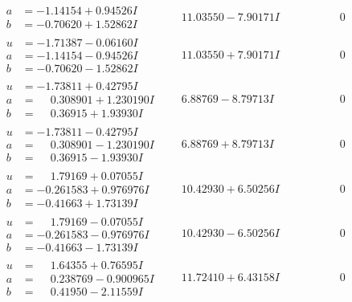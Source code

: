 \documentclass[1p]{elsarticle_modified}
\theoremstyle{definition}
\begin{document}
$$\begin{array}{c|c|c}
\begin{aligned}
a &= -1.14154 + 0.94526 I \\
b &= -0.70620 + 1.52862 I\end{aligned}
 & \phantom{-}11.03550 - 7.90171 I & \phantom{-0.000000 } 0 \\ \hline\begin{aligned}
u &= -1.71387 - 0.06160 I \\
a &= -1.14154 - 0.94526 I \\
b &= -0.70620 - 1.52862 I\end{aligned}
 & \phantom{-}11.03550 + 7.90171 I & \phantom{-0.000000 } 0 \\ \hline\begin{aligned}
u &= -1.73811 + 0.42795 I \\
a &= \phantom{-}0.308901 + 1.230190 I \\
b &= \phantom{-}0.36915 + 1.93930 I\end{aligned}
 & \phantom{-}6.88769 - 8.79713 I & \phantom{-0.000000 } 0 \\ \hline\begin{aligned}
u &= -1.73811 - 0.42795 I \\
a &= \phantom{-}0.308901 - 1.230190 I \\
b &= \phantom{-}0.36915 - 1.93930 I\end{aligned}
 & \phantom{-}6.88769 + 8.79713 I & \phantom{-0.000000 } 0 \\ \hline\begin{aligned}
u &= \phantom{-}1.79169 + 0.07055 I \\
a &= -0.261583 + 0.976976 I \\
b &= -0.41663 + 1.73139 I\end{aligned}
 & \phantom{-}10.42930 + 6.50256 I & \phantom{-0.000000 } 0 \\ \hline\begin{aligned}
u &= \phantom{-}1.79169 - 0.07055 I \\
a &= -0.261583 - 0.976976 I \\
b &= -0.41663 - 1.73139 I\end{aligned}
 & \phantom{-}10.42930 - 6.50256 I & \phantom{-0.000000 } 0 \\ \hline\begin{aligned}
u &= \phantom{-}1.64355 + 0.76595 I \\
a &= \phantom{-}0.238769 - 0.900965 I \\
b &= \phantom{-}0.41950 - 2.11559 I\end{aligned}
 & \phantom{-}11.72410 + 6.43158 I & \phantom{-0.000000 } 0 \\ \hline\begin{aligned}

\end{aligned}
\end{array}$$
\end{document}
